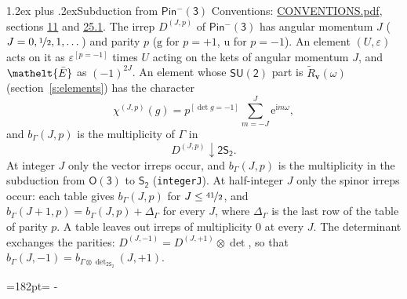 \documentclass[10pt,a4paper]{article}
\makeatletter
\renewcommand\section{\@startsection{section}{1}{\z@}{-3ex plus -1ex minus -.2ex}%
  {1.2ex plus .2ex}{\normalfont\large\sffamily\bfseries\color{parttitle}}}
\newcommand{\needspace}[1]{\par\penalty-100\begingroup\dimen0=#1\relax\dimen2=\pagegoal
  \advance\dimen2-\pagetotal\ifdim\dimen0>\dimen2\relax\ifdim\dimen2>0pt\vfil\break\fi\fi
  \endgroup}
\numberwithin{equation}{section}
\newcommand{\eltfont}[1]{{\let\sigma\eltsigma\mathelt{#1}}}
\newcommand{\grp}[1]{\mathsf{#1}}
\newcommand{\elt}[1]{\eltfont{#1}}
\newcommand{\ptag}[1]{\mathrm{#1}}
\newcommand{\iverson}[1]{[#1]}
\newcommand{\restr}[2]{#1\!\downarrow#2}
\newcommand{\vv}{\mathbf{v}}
\newcommand{\iunit}{\mathrm{i}}
\newcommand{\expe}{\mathrm{e}}
\newcommand{\irrJp}[2]{D^{(#1,#2)}}
\newcommand{\irrprod}{\otimes}
\newcommand{\barred}[1]{\bar{#1}}
\newcommand{\lift}[1]{\tilde{#1}}
\makeatother
\begin{document}
\section{Subduction from \texorpdfstring{$\grp{Pin^{-}(3)}$}{Pin(3)}}\label{s:subduction_parent}
Conventions: \href{../../CONVENTIONS.pdf}{CONVENTIONS.pdf}, sections \href{../../../rotation/CONVENTIONS.pdf\#conv.11}{11} and \href{../../CONVENTIONS.pdf\#conv.25.1}{25.1}.
\leavevmode\label{n:index.J}\label{n:index.parity}\label{n:irrep.o3}The irrep $\irrJp{J}{p}$ of \href{Pinminus3.pdf}{$\grp{Pin^{-}(3)}$} has angular momentum $J$ ($J = 0, \nicefrac{1}{2}, 1, \dots$) and parity $p$ ($\ptag{g}$ for $p = +1$, $\ptag{u}$ for $p = -1$). An element $(U, \varepsilon)$ acts on it as $\varepsilon^{[p = -1]}$ times $U$ acting on the kets of angular momentum $J$, and $\elt{\barred{E}}$ as $(-1)^{2J}$. \label{n:function.character.parent}\label{n:function.multiplicity}An element whose $\grp{SU(2)}$ part is $\lift{R}_{\vv}(\omega)$ (section~\ref{s:elements}) has the character
\begin{equation}\label{e:chi}\chi^{(J,p)}(g) = p^{\iverson{\det g = -1}}\sum_{m=-J}^{J} \expe^{\iunit m\omega},\end{equation}
and $b_\Gamma(J, p)$ is the multiplicity of $\Gamma$ in
\begin{equation}\label{e:parent}\restr{\irrJp{J}{p}}{\grp{2S_{2}}}.\end{equation}
At integer $J$ only the vector irreps occur, and $b_\Gamma(J, p)$ is the multiplicity in the subduction from $\grp{O(3)}$ to \href{../../../rotation/data/pdf/S2.pdf}{$\grp{S_{2}}$} (\texttt{integerJ}). \label{n:index.increment}At half-integer $J$ only the spinor irreps occur: each table gives $b_\Gamma(J, p)$ for $J \le \nicefrac{41}{2}$, and $b_\Gamma(J + 1, p) = b_\Gamma(J, p) + \Delta_\Gamma$ for every $J$, where $\Delta_\Gamma$ is the last row of the table of parity $p$. A table leaves out irreps of multiplicity 0 at every $J$.
\leavevmode\label{n:operator.determinant.character}The determinant exchanges the parities: $\irrJp{J}{-1} = \irrJp{J}{+1} \irrprod \det$, so that $b_\Gamma(J, -1) = b_{\Gamma \irrprod \det_{\grp{2S_{2}}}}(J, +1)$.
\needspace{182pt}
\end{document}
